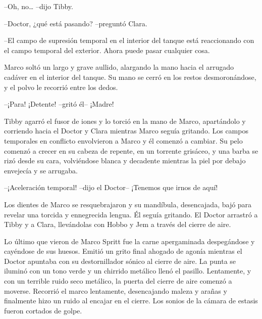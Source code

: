 {--Oh, no\ldots{} --dijo Tibby.}

{--Doctor, ¿qué está pasando? --preguntó Clara.}

{--El campo de supresión temporal en el interior del tanque está
 reaccionando con el campo temporal del exterior. Ahora puede pasar
cualquier cosa.}

{Marco soltó un largo y grave aullido, alargando la mano hacia el
 arrugado cadáver en el interior del tanque. Su mano se cerró en los
restos desmoronándose, y el polvo le recorrió entre los dedos.}

{--¡Para! ¡Detente! --gritó él-- ¡Madre!}

{Tibby agarró el fusor de iones y lo torció en la mano de Marco,
 apartándolo y corriendo hacia el Doctor y Clara mientras Marco seguía
 gritando. Los campos temporales en conflicto envolvieron a Marco y él
 comenzó a cambiar. Su pelo comenzó a crecer en su cabeza de repente, en
 un torrente grisáceo, y una barba se rizó desde su cara, volviéndose
 blanca y decadente mientras la piel por debajo envejecía y se
arrugaba.}

{--¡Aceleración temporal! --dijo el Doctor-- ¡Tenemos que irnos de
aquí!}

{Los dientes de Marco se resquebrajaron y su mandíbula, desencajada, bajó
 para revelar una torcida y ennegrecida lengua. Él seguía gritando. El
 Doctor arrastró a Tibby y a Clara, llevándolas con Hobbo y Jem a través
del cierre de aire.}

{Lo último que vieron de Marco Spritt fue la carne apergaminada
 despegándose y cayéndose de sus huesos. Emitió un grito final ahogado de
 agonía mientras el Doctor apuntaba con su destornillador sónico al
 cierre de aire. La punta se iluminó con un tono verde y un chirrido
 metálico llenó el pasillo. Lentamente, y con un terrible ruido seco
 metálico, la puerta del cierre de aire comenzó a moverse. Recorrió el
 marco lentamente, desencajando maleza y arañas y finalmente hizo un
 ruido al encajar en el cierre. Los sonios de la cámara de estasis fueron
cortados de golpe.}
